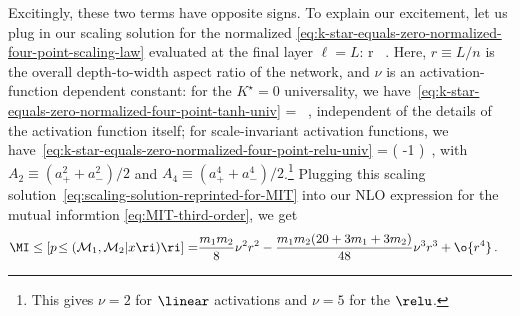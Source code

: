 Excitingly, these two terms have opposite signs.
To explain our excitement, let us plug in our scaling solution for the normalized   \eqref{eq:k-star-equals-zero-normalized-four-point-scaling-law} evaluated at the final layer $\ell=L$:
\be\label{eq:scaling-solution-reprinted-for-MIT}
 \equiv \nu r \, .
\ee
Here, $r \equiv L/n$ is the overall depth-to-width aspect ratio of the network, and $\nu$ is an activation-function dependent constant: for the $K^\star=0$ universality, we have~\eqref{eq:k-star-equals-zero-normalized-four-point-tanh-univ}
\be\label{eq:tanh-nu}
\nu = \, ,
\ee
independent of the details of the activation function itself; for scale-invariant activation functions, we have~\eqref{eq:k-star-equals-zero-normalized-four-point-relu-univ}
\be\label{eq:scale-invariant-nu}
\nu = \le( -1 \ri) \,,
\ee
with $A_2\equiv (a_+^2+a_-^2)/2$ and $A_4\equiv (a_+^4+a_-^4)/2$.\footnote{This gives $\nu=2$ for $\linear$ activations and $\nu=5$ for the $\relu$.} Plugging this scaling solution~\eqref{eq:scaling-solution-reprinted-for-MIT} into our NLO expression for the mutual informtion \eqref{eq:MIT-third-order}, we get
\begin{align}\label{eq:MIT-third-order-tangible}
\MI\le[p\!\le( \mathcal{M}_1 , \mathcal{M}_2 \vert x\ri)\ri]=&\frac{m_1m_2}{8}\nu^2r^2-\frac{m_1 m_2(20+3m_1+3m_2)}{48}\nu^3r^3+\o{r^4} \, .
\end{align}

